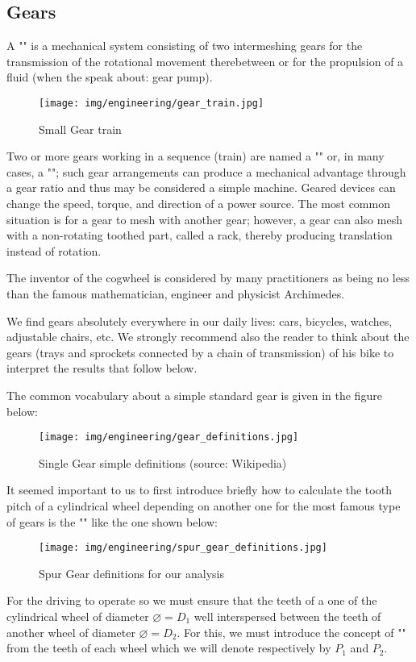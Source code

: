 	\subsection{Gears}
	A "" is a mechanical system consisting of two intermeshing gears for the transmission of the rotational movement therebetween or for the propulsion of a fluid (when the speak about: gear pump).
	\begin{figure}[H]
		\centering
		\texttt{[image: img/engineering/gear\_train.jpg]}	
		\caption{Small Gear train}
	\end{figure}
	
	Two or more gears working in a sequence (train) are named a "" or, in many cases, a ""; such gear arrangements can produce a mechanical advantage through a gear ratio and thus may be considered a simple machine. Geared devices can change the speed, torque, and direction of a power source. The most common situation is for a gear to mesh with another gear; however, a gear can also mesh with a non-rotating toothed part, called a rack, thereby producing translation instead of rotation.
	
	The inventor of the cogwheel is considered by many practitioners as being no less than the famous mathematician, engineer and physicist Archimedes.
	
	We find gears absolutely everywhere in our daily lives: cars, bicycles, watches, adjustable chairs, etc. We strongly recommend also the reader to think about the gears (trays and sprockets connected by a chain of transmission) of his bike to interpret the results that follow below.
	
	The common vocabulary about a simple standard gear is given in the figure below:
	\begin{figure}[H]
		\begin{center}
			\texttt{[image: img/engineering/gear\_definitions.jpg]}
		\end{center}	
		\caption[Single gear simple definitions]{Single Gear simple definitions (source: Wikipedia)}
	\end{figure}
	It seemed important to us to first introduce briefly how to calculate the tooth pitch of a cylindrical wheel depending on another one for the most famous type of gears is the "" like the one shown below:
	\begin{figure}[H]
		\begin{center}
			\texttt{[image: img/engineering/spur\_gear\_definitions.jpg]}
		\end{center}	
		\caption[]{Spur Gear definitions for our analysis}
	\end{figure}
	For the driving to operate so we must ensure that the teeth of a one of the cylindrical wheel of diameter $\varnothing=D_1$ well interspersed between the teeth of another wheel of diameter $\varnothing=D_2$. For this, we must introduce the concept of "" from the teeth of each wheel which we will denote respectively by $P_1$ and $P_2$.
	
